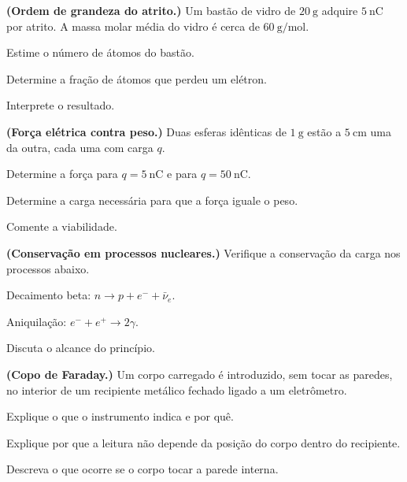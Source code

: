 \begin{questao}[4]{}

\textbf{(Ordem de grandeza do atrito.)} Um bastão de vidro de $\SI{20}{\gram}$
adquire $\SI{5}{\nano\coulomb}$ por atrito. A massa molar média do vidro é
cerca de $\SI{60}{\gram\per\mole}$.
\begin{itensq}
\item Estime o número de átomos do bastão.
\item Determine a fração de átomos que perdeu um elétron.
\item Interprete o resultado.
\end{itensq}


\end{questao}
\begin{questao}[4]{}

\textbf{(Força elétrica contra peso.)} Duas esferas idênticas de
$\SI{1}{\gram}$ estão a $\SI{5}{\centi\meter}$ uma da outra, cada uma com
carga $q$.
\begin{itensq}
\item Determine a força para $q=\SI{5}{\nano\coulomb}$ e para
      $q=\SI{50}{\nano\coulomb}$.
\item Determine a carga necessária para que a força iguale o peso.
\item Comente a viabilidade.
\end{itensq}


\end{questao}
\begin{questao}[4]{}

\textbf{(Conservação em processos nucleares.)} Verifique a conservação da carga
nos processos abaixo.
\begin{itensq}
\item Decaimento beta: $n\to p+e^{-}+\bar\nu_e$.
\item Aniquilação: $e^{-}+e^{+}\to2\gamma$.
\item Discuta o alcance do princípio.
\end{itensq}


\end{questao}
\begin{questao}[4]{}

\textbf{(Copo de Faraday.)} Um corpo carregado é introduzido, sem tocar as
paredes, no interior de um recipiente metálico fechado ligado a um eletrômetro.
\begin{itensq}
\item Explique o que o instrumento indica e por quê.
\item Explique por que a leitura não depende da posição do corpo dentro do
      recipiente.
\item Descreva o que ocorre se o corpo tocar a parede interna.
\end{itensq}


\end{questao}
